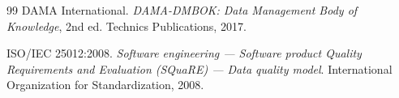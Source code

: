 \documentclass{article}
\begin{document}
\begin{thebibliography}{99}
DAMA International. \textit{DAMA-DMBOK: Data Management Body of Knowledge}, 2nd ed.
Technics Publications, 2017.

ISO/IEC 25012:2008. \textit{Software engineering --- Software product Quality Requirements and Evaluation (SQuaRE) --- Data quality model}. International Organization for Standardization, 2008.

\end{thebibliography}
\end{document}

